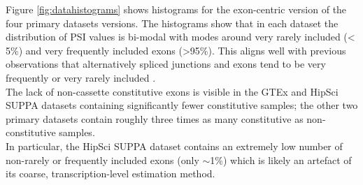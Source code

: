 Figure \ref{fig:datahistograms} shows histograms for the exon-centric version of the four primary datasets versions. The histograms show that in each dataset the distribution of PSI values is bi-modal with modes around very rarely included (< 5\%) and very frequently included exons (>95\%). This aligns well with previous observations that alternatively spliced junctions and exons tend to be very frequently or very rarely included \cite{buschhertel} \cite{bimodalpsivalues1} \cite{bimodalpsivalues2}.\\
The lack of non-cassette constitutive exons is visible in the GTEx and HipSci SUPPA datasets containing significantly fewer constitutive samples; the other two primary datasets contain roughly three times as many constitutive as non-constitutive samples. \\
In particular, the HipSci SUPPA dataset contains an extremely low number of non-rarely or frequently included exons (only $\sim$1\%) which is likely an artefact of its coarse, transcription-level estimation method.


